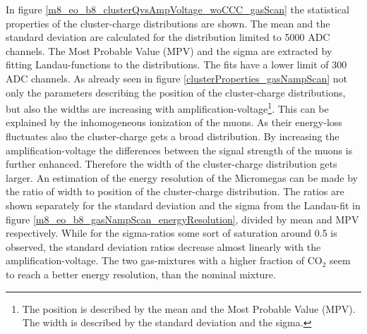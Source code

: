 \documentclass[
twoside,            %
BCOR1.4cm,          %
10pt,               %
headings=normal,    %
headsepline,        %
clearplainpage,		%
final,              %
div=14,
open=right,
bibliography=toc
]{scrreprt}
\begin{document}
In figure \ref{m8_eo_b8_clusterQvsAmpVoltage_woCCC_gasScan} the statistical properties of the cluster-charge distributions are shown.
The mean and the standard deviation are calculated for the distribution limited to 5000 ADC channels.
The Most  Probable Value (MPV) and the sigma are extracted by fitting Landau-functions to the distributions.
The fits have a lower limit of 300 ADC channels.
As already seen in figure \ref{clusterProperties_gasNampScan} not only the parameters describing the position of the cluster-charge distributions, but also the widths are increasing with amplification-voltage\footnote{
	The position is described by the mean and the Most Probable Value (MPV).
	The width is described by the standard deviation and the sigma. 
}.
This can be explained by the inhomogeneous ionization of the muons.
As their energy-loss fluctuates also the cluster-charge gets a broad distribution.
By increasing the amplification-voltage the differences between the signal strength of the muons is further enhanced.
Therefore the width of the cluster-charge distribution gets larger.
An estimation of the energy resolution of the Micromegas can be made by the ratio of width to position of the cluster-charge distribution.
The ratios are shown separately for the standard deviation and the sigma from the Landau-fit in figure \ref{m8_eo_b8_gasNampScan_energyResolution}, divided by mean and MPV respectively.
While for the sigma-ratios some sort of saturation around 0.5 is observed, the standard deviation ratios decrease almost linearly with the amplification-voltage.
The two gas-mixtures with a higher fraction of CO$_{2}$ seem to reach a better energy resolution, than the nominal mixture.
\end{document}
